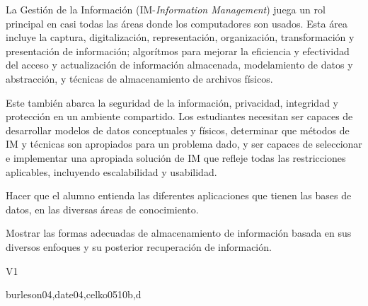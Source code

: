 \begin{syllabus}


\begin{justification}
La Gestión de la Información (IM-\textit{Information Management}) juega un rol principal en casi todas las áreas donde los computadores son usados. Esta área incluye la captura, digitalización, representación, organización, transformación y presentación de información; algorítmos para mejorar la eficiencia y efectividad del acceso y actualización de información almacenada, modelamiento de datos y abstracción, y técnicas de almacenamiento de archivos físicos.

Este también abarca la seguridad de la información, privacidad, integridad y protección en un ambiente compartido. Los estudiantes necesitan ser capaces de desarrollar modelos de datos conceptuales y físicos, determinar que métodos de IM y técnicas son apropiados para un problema dado, y ser capaces de seleccionar e implementar una apropiada solución de IM que refleje todas las restricciones aplicables, incluyendo escalabilidad y usabilidad.
\end{justification}

\begin{goals}
\item Hacer que el alumno entienda las diferentes aplicaciones que tienen las bases de datos, en las diversas áreas de conocimiento.
\item Mostrar las formas adecuadas de almacenamiento de información basada en sus diversos enfoques y su posterior recuperación de información.
\end{goals}

\begin{outcomes}{V1}
    \item {}
    \item {}
    \item {}
    \item {}
    \item {}
\end{outcomes}

\begin{unit}{\IMPhysicalDatabaseDesign}{}{burleson04,date04,celko05}{10}{b,d}
    \IMPhysicalDatabaseDesignAllTopics%
    \IMPhysicalDatabaseDesignAllLearningOutcomes
\end{unit}


\end{syllabus}
